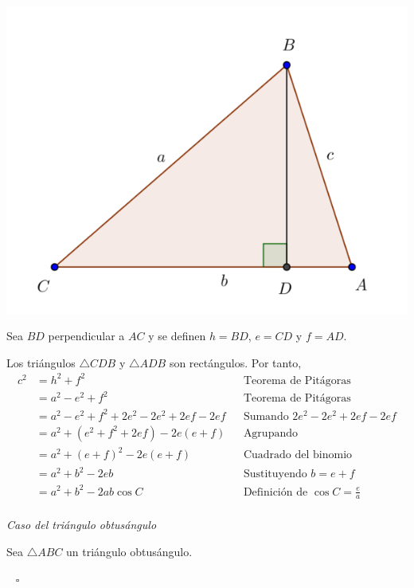 \documentclass[a4paper,12pt,twoside]{book}
\theoremstyle{teorema}
\theoremstyle{remark}
\newenvironment{demostracion}
{\noindent {\bf Demostración:}}
{\newline\mbox{ } \hfill $\square$}
\begin{document}
\begin{itemize}
\begin{demostracion}
\begin{center}
\includegraphics[width=.9\linewidth]{./fig/teorema-coseno.2.png}
\end{center}

Sea \(BD\) perpendicular a \(AC\) y se definen \(h = BD\), \(e = CD\) y \(f = AD\).

Los triángulos \(\triangle CDB\) y \(\triangle ADB\) son rectángulos. Por tanto, \\
\begin{align*}
c^2 &= h^2 + f^2
    && \text{Teorema de Pitágoras} \\
    &= a^2 - e^2 + f^2
    && \text{Teorema de Pitágoras} \\
    &= a^2 - e^2 + f^2 + 2e^2 - 2e^2 + 2ef - 2ef
    && \text{Sumando $2e^2 - 2e^2 + 2ef - 2ef$} \\
    &= a^2 + (e^2 + f^2 + 2ef) - 2e(e + f)
    && \text{Agrupando} \\
    &= a^2 + (e + f)^2 - 2e(e+f)
    && \text{Cuadrado del binomio} \\
    &= a^2 + b^2 - 2eb
    && \text{Sustituyendo $b = e + f$} \\
    &= a^2 + b^2 - 2 a b \cos C
    && \text{Definición de $\cos C = \frac{e}{a}$} \\
\end{align*}

\emph{Caso del triángulo obtusángulo}

Sea \(\triangle ABC\) un triángulo obtusángulo.


\end{demostracion}
\end{itemize}
\end{document}
